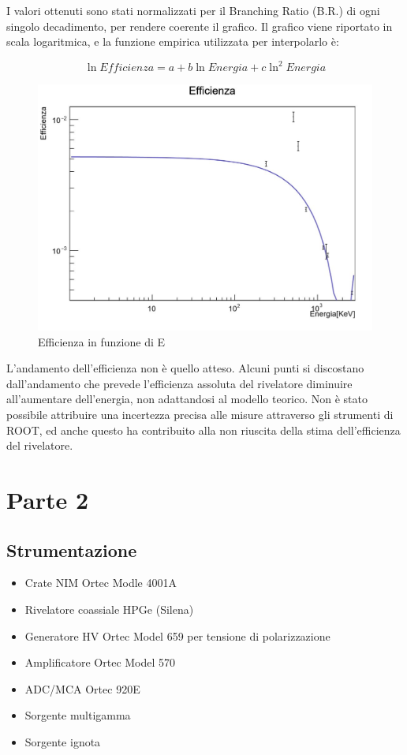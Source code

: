 \documentclass[a4paper,10pt]{article}
\begin{document}
I valori ottenuti sono stati normalizzati per il Branching Ratio (B.R.) di ogni singolo decadimento, per rendere coerente il grafico. Il grafico viene riportato in scala logaritmica, e la funzione empirica utilizzata per interpolarlo è:

\begin{equation}
	\ln{Efficienza}=a + b\ln{Energia} + c\ln^{2}{Energia}
\end{equation}

\begin{figure}[H]
    \centering
    \includegraphics[scale=0.45]{grafici/efficienzasources}
    \caption{Efficienza in funzione di E}
\end{figure}

L'andamento dell'efficienza non è quello atteso. Alcuni punti si discostano dall'andamento che prevede l'efficienza assoluta del rivelatore diminuire all'aumentare dell'energia, non adattandosi al modello teorico. Non è stato possibile attribuire una incertezza precisa alle misure attraverso gli strumenti di ROOT, ed anche questo ha contribuito alla non riuscita della stima dell'efficienza del rivelatore.

\section{Parte 2}
\subsection{Strumentazione}
\begin{itemize}
\item Crate NIM Ortec Modle 4001A
\item Rivelatore coassiale HPGe (Silena)
\item Generatore HV Ortec Model 659 per tensione di polarizzazione
\item Amplificatore Ortec Model 570
\item ADC/MCA Ortec 920E
\item Sorgente multigamma
\item Sorgente ignota
\end{itemize}
\end{document}
